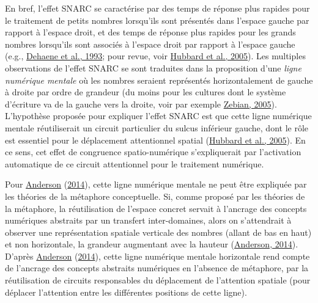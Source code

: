 \documentclass[
  a4paper,12pt,twoside,onecolumn,openright,final,oldfontcommands]{memoir}
\begin{document}
En bref, l'effet SNARC se caractérise par des temps de réponse plus rapides pour le traitement de petits nombres lorsqu'ils sont présentés dans l'espace gauche par rapport à l'espace droit, et des temps de réponse plus rapides pour les grands nombres lorsqu'ils sont associés à l'espace droit par rapport à l'espace gauche (e.g., \protect\hyperlink{ref-dehaene_mental_1993}{Dehaene et al., 1993}; pour revue, voir \protect\hyperlink{ref-hubbard_interactions_2005}{Hubbard et al., 2005}). Les multiples observations de l'effet SNARC se sont traduites dans la proposition d'une \emph{ligne numérique mentale} où les nombres seraient représentés horizontalement de gauche à droite par ordre de grandeur (du moins pour les cultures dont le système d'écriture va de la gauche vers la droite, voir par exemple \protect\hyperlink{ref-zebian_linkages_2005}{Zebian, 2005}). L'hypothèse proposée pour expliquer l'effet SNARC est que cette ligne numérique mentale réutiliserait un circuit particulier du sulcus inférieur gauche, dont le rôle est essentiel pour le déplacement attentionnel spatial (\protect\hyperlink{ref-hubbard_interactions_2005}{Hubbard et al., 2005}). En ce sens, cet effet de congruence spatio-numérique s'expliquerait par l'activation automatique de ce circuit attentionnel pour le traitement numérique.

Pour \protect\hyperlink{ref-anderson_after_2014}{Anderson} (\protect\hyperlink{ref-anderson_after_2014}{2014}), cette ligne numérique mentale ne peut être expliquée par les théories de la métaphore conceptuelle. Si, comme proposé par les théories de la métaphore, la réutilisation de l'espace concret servait à l'ancrage des concepts numériques abstraits par un transfert inter-domaines, alors on s'attendrait à observer une représentation spatiale verticale des nombres (allant de bas en haut) et non horizontale, la grandeur augmentant avec la hauteur (\protect\hyperlink{ref-anderson_after_2014}{Anderson, 2014}). D'après \protect\hyperlink{ref-anderson_after_2014}{Anderson} (\protect\hyperlink{ref-anderson_after_2014}{2014}), cette ligne numérique mentale horizontale rend compte de l'ancrage des concepts abstraits numériques en l'absence de métaphore, par la réutilisation de circuits responsables du déplacement de l'attention spatiale (pour déplacer l'attention entre les différentes positions de cette ligne).
\end{document}
